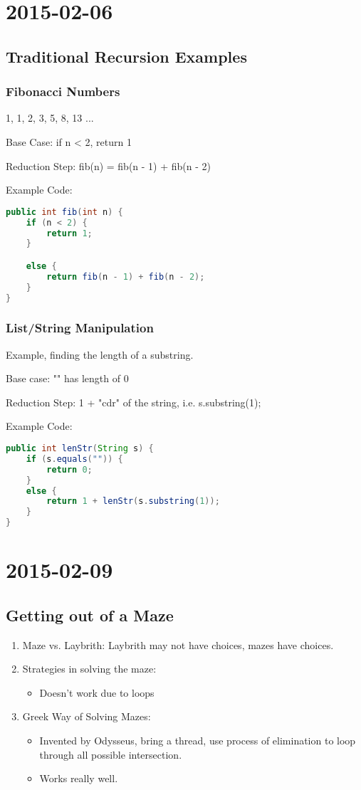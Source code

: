 \documentclass [12 pt, twoside] {article}
\begin{document}
\section{2015-02-06}

\subsection{Traditional Recursion Examples}
\subsubsection{Fibonacci Numbers}
1, 1, 2, 3, 5, 8, 13 ...


Base Case: if n < 2, return 1


Reduction Step: fib(n) = fib(n - 1) + fib(n - 2)


Example Code:
\begin{lstlisting}[language=Java]
public int fib(int n) {
	if (n < 2) {
		return 1;
	}

	else {
		return fib(n - 1) + fib(n - 2);
	}
}
\end{lstlisting}

\subsubsection{List/String Manipulation}


Example, finding the length of a substring.


Base case: "" has length of 0


Reduction Step: 1 + "cdr" of the string, i.e. s.substring(1);


Example Code:
\begin{lstlisting}[language=Java]
public int lenStr(String s) {
	if (s.equals("")) {
		return 0;
	}
	else {
		return 1 + lenStr(s.substring(1));
	}
}
\end{lstlisting}

\section{2015-02-09}
\subsection{Getting out of a Maze}
\begin{enumerate}
	\item Maze vs. Laybrith: Laybrith may not have choices, mazes have choices.
	\item Strategies in solving the maze:
		\begin{itemize}
			\item Doesn't work due to loops
		\end{itemize}
	\item Greek Way of Solving Mazes:
		\begin{itemize}
			\item Invented by Odysseus, bring a thread, use process of elimination to loop through all possible intersection.
			\item Works really well.
		\end{itemize}
\end{enumerate}
\end{document}
